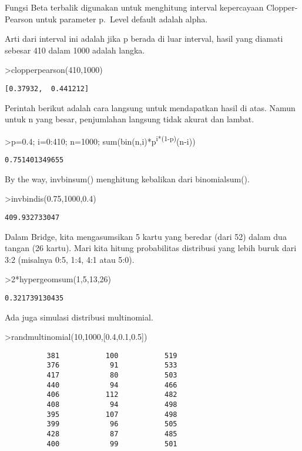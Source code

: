 \documentclass[
]{book}
\begin{document}
Fungsi Beta terbalik digunakan untuk menghitung interval kepercayaan Clopper-Pearson untuk parameter p.~Level default adalah alpha.

Arti dari interval ini adalah jika p berada di luar interval, hasil yang diamati sebesar 410 dalam 1000 adalah langka.

\textgreater clopperpearson(410,1000)

\begin{verbatim}
[0.37932,  0.441212]
\end{verbatim}

Perintah berikut adalah cara langsung untuk mendapatkan hasil di atas. Namun untuk n yang besar, penjumlahan langsung tidak akurat dan lambat.

\textgreater p=0.4; i=0:410; n=1000; sum(bin(n,i)*p\textsuperscript{i*(1-p)}(n-i))

\begin{verbatim}
0.751401349655
\end{verbatim}

By the way, invbinsum() menghitung kebalikan dari binomialsum().

\textgreater invbindis(0.75,1000,0.4)

\begin{verbatim}
409.932733047
\end{verbatim}

Dalam Bridge, kita mengasumsikan 5 kartu yang beredar (dari 52) dalam dua tangan (26 kartu). Mari kita hitung probabilitas distribusi yang lebih buruk dari 3:2 (misalnya 0:5, 1:4, 4:1 atau 5:0).

\textgreater2*hypergeomsum(1,5,13,26)

\begin{verbatim}
0.321739130435
\end{verbatim}

Ada juga simulasi distribusi multinomial.

\textgreater randmultinomial(10,1000,{[}0.4,0.1,0.5{]})

\begin{verbatim}
          381           100           519 
          376            91           533 
          417            80           503 
          440            94           466 
          406           112           482 
          408            94           498 
          395           107           498 
          399            96           505 
          428            87           485 
          400            99           501 
\end{verbatim}
\end{document}
